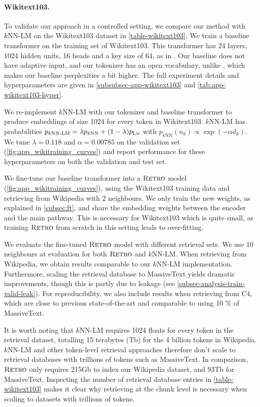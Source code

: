 \documentclass[11pt, a4paper, logo]{deepmind}
\newcommand{\knnlm}{k\textrm{NN-LM}}
\newcommand{\knn}{k\textrm{NN}}
\newcommand{\retro}{\textsc{Retro}\xspace}
\newcommand{\lm}{\textsc{Lm}}
\begin{document}
\paragraph{Wikitext103.} To validate our approach in a controlled setting, we compare our method with $\knnlm$ \citep{khandelwal2020generalization} on the Wikitext103 dataset in \autoref{table-wikitext103}. 
We train a baseline transformer on the training set of Wikitext103. This transformer has 24 layers, 1024 hidden units, 16 heads and a key size of 64, as in \cite{baevski2019adaptive}. Our baseline does not have adaptive input, and our tokenizer has an open vocabulary, unlike \cite{baevski2019adaptive}, which makes our baseline perplexities a bit higher. The full experiment details and hyperparameters are given in \autoref{subsubsec-app-wikitext103} and \autoref{tab:app-wikitext103-hyper}.

We re-implement $\knnlm$ with our tokenizer and baseline transformer to produce embeddings of size 1024 for every token in Wikitext103. $\knnlm$ has probabilities $p_{\knnlm}=  \lambda p_{\knn} + (1-\lambda) p_{\lm}  $ with $p_{\knn} \left (n_k \right ) \propto \exp \left (-\alpha d_k \right )$. We tune $\lambda=0.118$ and $\alpha=0.00785$ on the validation set (\autoref{fig:app_wikitraining_curves}) and report performance for these hyperparameters on both the validation and test set.

We fine-tune our baseline transformer into a $\retro$ model (\autoref{fig:app_wikitraining_curves}), using the Wikitext103 training data and retrieving from Wikipedia with 2 neighbours. 
We only train the new weights, as explained in \autoref{subsec:ft}, and share the embedding weights between the encoder and the main pathway. This is necessary for Wikitext103 which is quite small, as training $\retro$ from scratch in this setting leads to over-fitting. 

We evaluate the fine-tuned $\retro$ model with different retrieval sets.
We use 10 neighbours at evaluation for both $\retro$ and $\knnlm$.  
When retrieving from Wikipedia, we obtain results comparable to our $\knnlm$ implementation. 
Furthermore, scaling the retrieval database to MassiveText yields dramatic improvements, though this is partly due to leakage (see \autoref{subsec-analysis-train-valid-leak}).
For reproducibility, we also include results when retrieving from C4, which are close to previous state-of-the-art and comparable to using 10 \% of MassiveText. 

It is worth noting that $\knnlm$ requires 1024 floats for every token in the retrieval dataset, totalling 15 terabytes (Tb) for the 4 billion tokens in Wikipedia.
$\knnlm$ and other token-level retrieval approaches therefore don't scale to retrieval databases with trillions of tokens such as MassiveText.
In comparison, $\retro$ only requires 215Gb to index our Wikipedia dataset, and 93Tb for MassiveText.
Inspecting the number of retrieval database entries in \autoref{table-wikitext103} makes it clear why retrieving at the chunk level is necessary when scaling to datasets with trillions of tokens.
\end{document}
